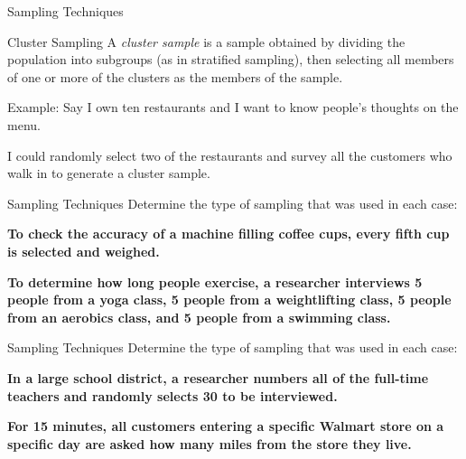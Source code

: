 \documentclass[t]{beamer}
\newcommand{\?}{\stackrel{?}{=}}
\begin{document}
	\begin{frame}{Sampling Techniques}
		\begin{block}{Cluster Sampling}
			A \textit{cluster sample} is a sample obtained by dividing the population into subgroups (as in stratified sampling), then selecting all members of one or more of the clusters as the members of the sample.
		\end{block}
	
		Example: Say I own ten restaurants and I want to know people's thoughts on the menu. \pause
		
		I could randomly select two of the restaurants and survey all the customers who walk in to generate a cluster sample.
	\end{frame}

	\begin{frame}{Sampling Techniques}
		Determine the type of sampling that was used in each case:
		
		\textbf{To check the accuracy of a machine filling coffee cups, every fifth cup is selected and weighed.}
		
		
		\textbf{To determine how long people exercise, a researcher interviews 5 people from a yoga class, 5 people from a weightlifting class, 5 people from an aerobics class, and 5 people from a swimming class.}
		
	\end{frame}

	\begin{frame}{Sampling Techniques}
		Determine the type of sampling that was used in each case:
		
		\textbf{In a large school district, a researcher numbers all of the full-time teachers and randomly selects 30 to be interviewed.}
		
		
		\textbf{For 15 minutes, all customers entering a specific Walmart store on a specific day are asked how many miles from the store they live.}
		
	\end{frame}
\end{document}

